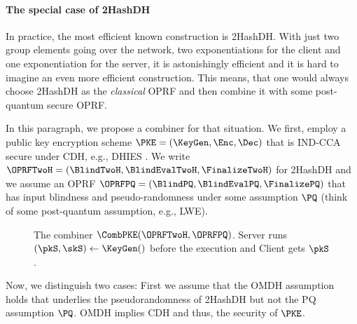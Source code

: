 \paragraph{The special case of 2HashDH}
In practice, the most efficient known construction is 2HashDH. With just two group elements going over the network, two exponentiations for the client and one exponentiation for the server, 
it is astonishingly efficient and it is hard to imagine an even more efficient construction.
This means, that one would always choose 2HashDH as the \emph{classical} OPRF and then combine it with some post-quantum secure OPRF.

In this paragraph, we propose a combiner for that situation. We first, employ a public key encryption scheme $\PKE=(\KeyGen,\Enc,\Dec)$ that is IND-CCA secure under CDH, e.g., DHIES \cite{CT-RSA:AbdBelRog01}.
We write $\OPRFTwoH=(\BlindTwoH,\BlindEvalTwoH,\FinalizeTwoH)$ for 2HashDH and we assume an OPRF $\OPRFPQ=(\BlindPQ,\BlindEvalPQ,\FinalizePQ)$
that has input blindness and pseudo-randomness under some assumption $\PQ$ (think of some post-quantum assumption, e.g., LWE).
\begin{figure}
    \centering
    \caption{The combiner $\CombPKE(\OPRFTwoH,\OPRFPQ)$. Server runs $(\pkS,\skS)\gets\KeyGen()$ before the execution and Client gets $\pkS$. }
    \label{fig:combiner}
\end{figure}
Now, we distinguish two cases: First we assume that the OMDH assumption holds that underlies the pseudorandomness of 2HashDH but not the PQ assumption $\PQ$.
OMDH implies CDH and thus, the security of $\PKE$.

